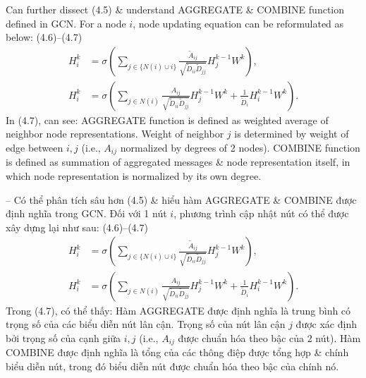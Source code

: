 \documentclass{article}
\begin{document}
\begin{itemize}
\begin{itemize}
\begin{itemize}
            Can further dissect (4.5) \& understand AGGREGATE \& COMBINE function defined in GCN. For a node $i$, node updating equation can be reformulated as below: (4.6)--(4.7)
            \begin{align*}
                H_i^k &= \sigma\left(\sum_{j\in\{N(i)\cup i\}} \frac{\tilde{A}_{ij}}{\sqrt{\tilde{D}_{ii}\tilde{D}_{jj}}}H_j^{k-1}W^k\right),\\
                H_i^k &= \sigma\left(\sum_{j\in N(i)} \frac{A_{ij}}{\sqrt{\tilde{D}_{ii}\tilde{D}_{jj}}}H_j^{k-1}W^k + \frac{1}{\tilde{D}_i}H_i^{k-1}W^k\right).
            \end{align*}
            In (4.7), can see: AGGREGATE function is defined as weighted average of neighbor node representations. Weight of neighbor $j$ is determined by weight of edge between $i,j$ (i.e., $A_{ij}$ normalized by degrees of 2 nodes). COMBINE function is defined as summation of aggregated messages \& node representation itself, in which node representation is normalized by its own degree.

            -- Có thể phân tích sâu hơn (4.5) \& hiểu hàm AGGREGATE \& COMBINE được định nghĩa trong GCN. Đối với 1 nút $i$, phương trình cập nhật nút có thể được xây dựng lại như sau: (4.6)--(4.7)
            \begin{align*}
                H_i^k &= \sigma\left(\sum_{j\in\{N(i)\cup i\}} \frac{\tilde{A}_{ij}}{\sqrt{\tilde{D}_{ii}\tilde{D}_{jj}}}H_j^{k-1}W^k\right),\\
                H_i^k &= \sigma\left(\sum_{j\in N(i)} \frac{A_{ij}}{\sqrt{\tilde{D}_{ii}\tilde{D}_{jj}}}H_j^{k-1}W^k + \frac{1}{\tilde{D}_i}H_i^{k-1}W^k\right).
            \end{align*}
            Trong (4.7), có thể thấy: Hàm AGGREGATE được định nghĩa là trung bình có trọng số của các biểu diễn nút lân cận. Trọng số của nút lân cận $j$ được xác định bởi trọng số của cạnh giữa $i,j$ (i.e., $A_{ij}$ được chuẩn hóa theo bậc của 2 nút). Hàm COMBINE được định nghĩa là tổng của các thông điệp được tổng hợp \& chính biểu diễn nút, trong đó biểu diễn nút được chuẩn hóa theo bậc của chính nó.


\end{itemize}
\end{itemize}
\end{itemize}
\end{document}
